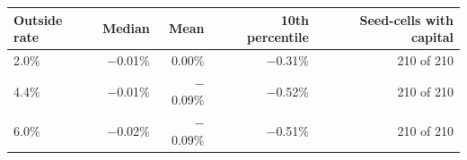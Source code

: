 \begin{tabular}{lrrrr}
\toprule
Outside rate & Median & Mean & 10th percentile & Seed-cells with capital \\
\midrule
2.0\% & $-$0.01\% & 0.00\% & $-$0.31\% & 210 of 210 \\
4.4\% & $-$0.01\% & $-$0.09\% & $-$0.52\% & 210 of 210 \\
6.0\% & $-$0.02\% & $-$0.09\% & $-$0.51\% & 210 of 210 \\
\bottomrule
\end{tabular}
